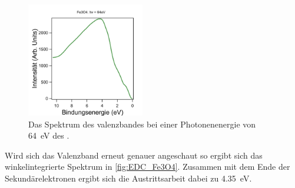        \begin{figure}
            \centering
            \includegraphics[height=5cm]{./content/pictures/Fe3O4/Fermi_Fe3O4.png}
            \caption{Das Spektrum des valenzbandes bei einer Photonenenergie von \SI{64}{\electronvolt} des .}
            \label{fig:EDC_Fe3O4}
        \end{figure}
        Wird sich das Valenzband erneut genauer angeschaut so ergibt sich das winkelintegrierte Spektrum in \autoref{fig:EDC_Fe3O4}.
        Zusammen mit dem Ende der Sekundärelektronen ergibt sich die Austrittsarbeit dabei zu \SI{4.35}{\electronvolt}.

